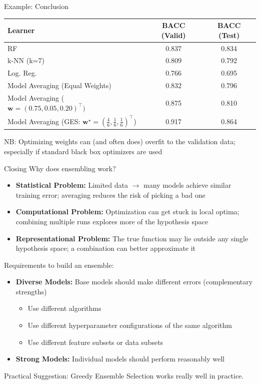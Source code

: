 \documentclass[10pt,compress,t,notes=noshow, xcolor=table]{beamer}
\begin{document}
\begin{vbframe}{Example: Conclusion}
\begin{table}[h]
\centering
\begin{tabular}{lcc}
\hline
\textbf{Learner} & \textbf{BACC} (Valid) & \textbf{BACC} (Test) \\
\hline
RF & 0.837 & 0.834 \\
k-NN (k=7) & 0.809 & 0.792 \\
Log. Reg. & 0.766 & 0.695 \\
Model Averaging (Equal Weights) & 0.832 & 0.796 \\
Model Averaging ($\mathbf{w} = (0.75, 0.05, 0.20)^\intercal)$ & 0.875 & 0.810 \\
Model Averaging (GES: $\mathbf{w}^{\star} = (\frac{4}{6}, \frac{1}{6}, \frac{1}{6})^\intercal$) & 0.917 & 0.864\\
\hline
\end{tabular}
\label{table:learners_valid_test_final}
\end{table}
\vfill
NB: Optimizing weights can (and often does) overfit to the validation data; especially if standard black box optimizers are used\\
\end{vbframe}


\begin{vbframe}{Closing}
\vfill
Why does ensembling work? 
\begin{itemize}
    \item \textbf{Statistical Problem:} Limited data $\rightarrow$ many models achieve similar training error; averaging reduces the risk of picking a bad one
    \item \textbf{Computational Problem:} Optimization can get stuck in local optima; combining multiple runs explores more of the hypothesis space
    \item \textbf{Representational Problem:} The true function may lie outside any single hypothesis space; a combination can better approximate it
\end{itemize}
\vfill
Requirements to build an ensemble:
\begin{itemize}
    \item \textbf{Diverse Models:} Base models should make different errors (complementary strengths)
    \begin{itemize}
        \item Use different algorithms
        \item Use different hyperparameter configurations of the same algorithm
        \item Use different feature subsets or data subsets
    \end{itemize}
    \item \textbf{Strong Models:} Individual models should perform reasonably well
\end{itemize}
\vfill
Practical Suggestion: Greedy Ensemble Selection works really well in practice.
\vfill
\end{vbframe}



\endlecture
\end{document}
